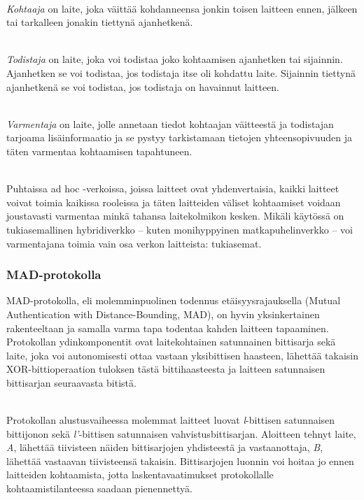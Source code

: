 \documentclass[finnish]{tktltiki2}
\theoremstyle{definition}
\theoremstyle{remark}
\begin{document}
\noindent\\
\emph{Kohtaaja} on laite, joka väittää kohdanneensa jonkin toisen laitteen ennen, jälkeen tai tarkalleen jonakin tiettynä ajanhetkenä. 

\noindent\\
\emph{Todistaja} on laite, joka voi todistaa joko kohtaamisen ajanhetken tai sijainnin. Ajanhetken se voi todistaa, jos todistaja itse oli kohdattu laite. Sijainnin tiettynä ajanhetkenä se voi todistaa, jos todistaja on havainnut laitteen.

\noindent\\
\emph{Varmentaja} on laite, jolle annetaan tiedot kohtaajan väitteestä ja todistajan tarjoama lisäinformaatio ja se pystyy tarkistamaan tietojen yhteensopivuuden ja täten varmentaa kohtaamisen tapahtuneen.


\noindent\\
Puhtaissa ad hoc -verkoissa, joissa laitteet ovat yhdenvertaisia, kaikki laitteet voivat toimia kaikissa rooleissa ja täten laitteiden väliset kohtaamiset voidaan joustavasti varmentaa minkä tahansa laitekolmikon kesken. Mikäli käytössä on tukiasemallinen hybridiverkko -- kuten monihyppyinen matkapuhelinverkko -- voi varmentajana toimia vain osa verkon laitteista: tukiasemat.

\subsubsection{MAD-protokolla}

MAD-protokolla, eli molemminpuolinen todennus etäisyysrajauksella (Mutual Authentication with Distance-Bounding, MAD), on hyvin yksinkertainen rakenteeltaan ja samalla varma tapa todentaa kahden laitteen tapaaminen. Protokollan ydinkomponentit ovat laitekohtainen satunnainen bittisarja sekä laite, joka voi autonomisesti ottaa vastaan yksibittisen haasteen, lähettää takaisin XOR-bittioperaation tuloksen tästä bittihaasteesta ja laitteen satunnaisen bittisarjan seuraavasta bitistä.

\noindent\\
Protokollan alustusvaiheessa molemmat laitteet luovat \emph{l}-bittisen satunnaisen bittijonon sekä \emph{l'}-bittisen satunnaisen vahvistusbittisarjan. Aloitteen tehnyt laite, \emph{A}, lähettää tiivisteen näiden bittisarjojen yhdisteestä ja vastaanottaja, \emph{B}, lähettää vastaavan tiivisteensä takaisin. Bittisarjojen luonnin voi hoitaa jo ennen laitteiden kohtaamista, jotta laskentavaatimukset protokollalle kohtaamistilanteessa saadaan pienennettyä.
\end{document}
